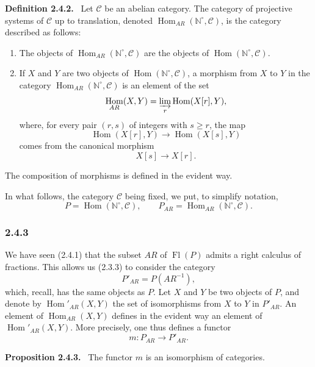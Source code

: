 \documentclass[11pt]{article}
\providecommand{\NN}{\mathbb{N}}
\newenvironment{statement}[1]{\par\medskip\noindent\textbf{#1.}\ }{\par\medskip}
\DeclareMathOperator{\Hom}{Hom}
\providecommand{\Hom}{\operatorname{Hom}}
\providecommand{\Fl}{\operatorname{Fl}}
\providecommand{\NN}{\mathbb N}
\providecommand{\cC}{\mathcal C}
\providecommand{\cC}{\mathcal C}
\begin{document}
\begin{statement}{Definition 2.4.2}
Let $\cC$ be an abelian category. The category of projective systems of $\cC$ up to translation, denoted $\Hom_{AR}(\NN^\circ,\cC)$, is the category described as follows:
\begin{enumerate}[label=(\roman*)]
\item The objects of $\Hom_{AR}(\NN^\circ,\cC)$ are the objects of $\Hom(\NN^\circ,\cC)$.
\item If $X$ and $Y$ are two objects of $\Hom(\NN^\circ,\cC)$, a morphism from $X$ to $Y$ in the category $\Hom_{AR}(\NN^\circ,\cC)$ is an element of the set
\[
\Hom_{AR}(X,Y)=\varinjlim_r\Hom(X[r],Y),
\]
where, for every pair $(r,s)$ of integers with $s\ge r$, the map
\[
\Hom(X[r],Y)\longrightarrow\Hom(X[s],Y)
\]
comes from the canonical morphism
\[
X[s]\longrightarrow X[r].
\]
\end{enumerate}
The composition of morphisms is defined in the evident way.
\end{statement}
In what follows, the category $\cC$ being fixed, we put, to simplify notation,
\[
P=\Hom(\NN^\circ,\cC),\qquad P_{AR}=\Hom_{AR}(\NN^\circ,\cC).
\]

\subsubsection*{2.4.3}
We have seen (2.4.1) that the subset $AR$ of $\Fl(P)$ admits a right calculus of fractions. This allows us (2.3.3) to consider the category
\[
P'_{AR}=P(AR^{-1}),
\]
which, recall, has the same objects as $P$. Let $X$ and $Y$ be two objects of $P$, and denote by $\Hom'_{AR}(X,Y)$ the set of isomorphisms from $X$ to $Y$ in $P'_{AR}$. An element of $\Hom_{AR}(X,Y)$ defines in the evident way an element of $\Hom'_{AR}(X,Y)$. More precisely, one thus defines a functor
\[
m:P_{AR}\longrightarrow P'_{AR}.
\]

\begin{statement}{Proposition 2.4.3}
The functor $m$ is an isomorphism of categories.
\end{statement}
\end{document}
